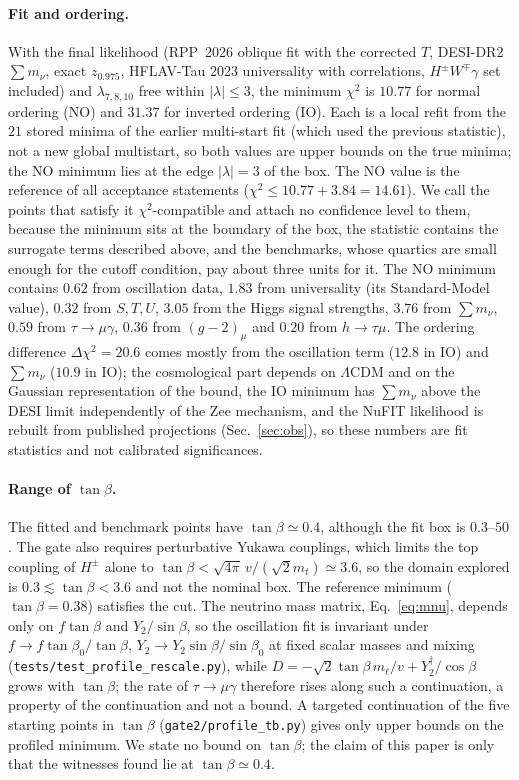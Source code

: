 \documentclass[twocolumn,epjc3]{svjour3}
\begin{document}
\paragraph{Fit and ordering.} With the final likelihood (RPP~2026 oblique fit with the corrected $T$, DESI-DR2 $\sum m_\nu$, exact $z_{0.975}$, HFLAV-Tau 2023 universality with correlations, $H^\pm W^\mp\gamma$ set included) and $\lambda_{7,8,10}$ free within $|\lambda|\le3$, the minimum $\chi^2$ is $10.77$ for normal ordering (NO) and $31.37$ for inverted ordering (IO). Each is a local refit from the $21$ stored minima of the earlier multi-start fit (which used the previous statistic), not a new global multistart, so both values are upper bounds on the true minima; the NO minimum lies at the edge $|\lambda|=3$ of the box. The NO value is the reference of all acceptance statements ($\chi^2\le10.77+3.84=14.61$). We call the points that satisfy it $\chi^2$-compatible and attach no confidence level to them, because the minimum sits at the boundary of the box, the statistic contains the surrogate terms described above, and the benchmarks, whose quartics are small enough for the cutoff condition, pay about three units for it. The NO minimum contains $0.62$ from oscillation data, $1.83$ from universality (its Standard-Model value), $0.32$ from $S,T,U$, $3.05$ from the Higgs signal strengths, $3.76$ from $\sum m_\nu$, $0.59$ from $\tau\to\mu\gamma$, $0.36$ from $(g-2)_\mu$ and $0.20$ from $h\to\tau\mu$. The ordering difference $\Delta\chi^2=20.6$ comes mostly from the oscillation term ($12.8$ in IO) and $\sum m_\nu$ ($10.9$ in IO); the cosmological part depends on $\Lambda$CDM and on the Gaussian representation of the bound, the IO minimum has $\sum m_\nu$ above the DESI limit independently of the Zee mechanism, and the NuFIT likelihood is rebuilt from published projections (Sec.~\ref{sec:obs}), so these numbers are fit statistics and not calibrated significances.

\paragraph{Range of $\tan\beta$.}\label{par:tanb} The fitted and benchmark points have $\tan\beta\simeq0.4$, although the fit box is $0.3$--$50$. The gate also requires perturbative Yukawa couplings, which limits the top coupling of $H^\pm$ alone to $\tan\beta<\sqrt{4\pi}\,v/(\sqrt2m_t)\simeq3.6$, so the domain explored is $0.3\lesssim\tan\beta<3.6$ and not the nominal box. The reference minimum ($\tan\beta=0.38$) satisfies the cut. The neutrino mass matrix, Eq.~\eqref{eq:mnu}, depends only on $f\tan\beta$ and $Y_2/\sin\beta$, so the oscillation fit is invariant under $f\to f\tan\beta_0/\tan\beta$, $Y_2\to Y_2\sin\beta/\sin\beta_0$ at fixed scalar masses and mixing (\texttt{tests/test\_profile\_rescale.py}), while $D=-\sqrt2\tan\beta\,m_\ell/v+Y_2^\dagger/\cos\beta$ grows with $\tan\beta$; the rate of $\tau\to\mu\gamma$ therefore rises along such a continuation, a property of the continuation and not a bound. A targeted continuation of the five starting points in $\tan\beta$ (\texttt{gate2/profile\_tb.py}) gives only upper bounds on the profiled minimum. We state no bound on $\tan\beta$; the claim of this paper is only that the witnesses found lie at $\tan\beta\simeq0.4$.
\end{document}
